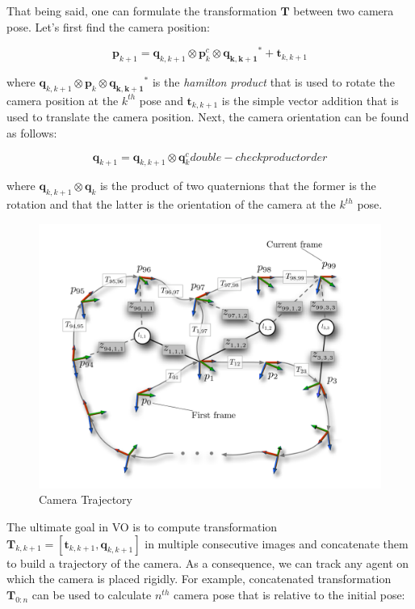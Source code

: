 \documentclass[a4paper]{report}
\numberwithin{figure}{section}
\begin{document}
That being said, one can formulate the transformation $\mathbf{T}$ 
between two camera pose. Let's first find the camera position:

\begin{equation}
  \mathbf{p}_{k+1} = 
  \mathbf{q}_{k,k+1} \otimes \mathbf{p}_k^c \otimes \mathbf{q_{k,k+1}}^* + 
  \mathbf{t}_{k,k+1}
\end{equation}

where $\mathbf{q}_{k,k+1} \otimes \mathbf{p}_k \otimes \mathbf{q_{k,k+1}}^*$ is the 
\textit{hamilton product} that is used to rotate the camera position at the $k^{th}$ pose 
and $\mathbf{t}_{k,k+1}$ is 
the simple vector addition that is used to translate the camera position. Next, 
the camera orientation can be found as follows:

\begin{equation}
  \mathbf{q}_{k+1} = 
  \mathbf{q}_{k,k+1} \otimes \mathbf{q}_{k}^c double-check product order
\end{equation}

where $\mathbf{q}_{k,k+1} \otimes \mathbf{q}_{k}$ is the product of two 
quaternions that the former is the rotation and that the latter is the orientation 
of the camera at the $k^{th}$ pose.

\begin{figure}[H]
	\centering
  \includegraphics[width=0.7\linewidth,natwidth=640,natheight=640]
  {fig/ref_imgs/cam_trajectory.png}
  \caption{Camera Trajectory}
	\label{fig:cam_trajectory}
\end{figure}


The ultimate goal in VO is to compute transformation
$\mathbf{T}_{k,k+1}=[\mathbf{t}_{k,k+1},\mathbf{q}_{k,k+1}]$ in multiple consecutive 
images and concatenate them to build a trajectory of the camera.
As a consequence, we can track any agent on which the camera is placed rigidly. 
For example, concatenated transformation $\mathbf{T}_{0:n}$ 
can be used to calculate $n^{th}$ camera pose that is relative to the initial pose:
\end{document}
